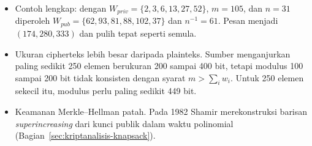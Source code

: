 \begin{itemize}
    \item Contoh lengkap: dengan $W_{priv} = \{2,3,6,13,27,52\}$, $m = 105$,
          dan $n = 31$ diperoleh $W_{pub} = \{62,93,81,88,102,37\}$ dan
          $n^{-1} = 61$. Pesan  menjadi
          $(174, 280, 333)$ dan pulih tepat seperti semula.
    \item Ukuran cipherteks lebih besar daripada plainteks. Sumber
          menganjurkan paling sedikit 250 elemen berukuran 200 sampai 400 bit,
          tetapi modulus 100 sampai 200 bit tidak konsisten dengan syarat
          $m > \sum_i w_i$. Untuk 250 elemen sekecil itu, modulus perlu paling
          sedikit 449 bit.
    \item Keamanan Merkle--Hellman patah. Pada 1982 Shamir merekonstruksi
          barisan \textit{superincreasing} dari kunci publik dalam waktu
          polinomial (Bagian~\ref{sec:kriptanalisis-knapsack}).
\end{itemize}
